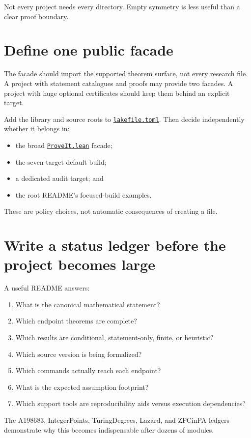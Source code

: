 \documentclass[
  10pt,
  a4paper,
  twoside,
  open=any,
  parskip=half,
  headings=big
]{scrreprt}
\newcommand{\CommitFull}{56a402bf82a9aab119fcbe3e96b991d387b221c5}
\newcommand{\RepoWeb}{https://github.com/VladimirReshetnikov/ProveIt}
\newcommand{\RepoBlobBase}{\RepoWeb/blob/\CommitFull}
\newcommand{\RepoFile}[1]{\href{\RepoBlobBase/#1}{\nolinkurl{#1}}}
\begin{document}
Not every project needs every directory. Empty symmetry is less useful than a clear proof boundary.

\section{Define one public facade}

The facade should import the supported theorem surface, not every research file. A project with statement catalogues and proofs may provide two facades. A project with huge optional certificates should keep them behind an explicit target.

Add the library and source roots to \RepoFile{lakefile.toml}. Then decide independently whether it belongs in:

\begin{itemize}
  \item the broad \RepoFile{ProveIt.lean} facade;
  \item the seven-target default build;
  \item a dedicated audit target; and
  \item the root README's focused-build examples.
\end{itemize}

These are policy choices, not automatic consequences of creating a file.

\section{Write a status ledger before the project becomes large}

A useful README answers:

\begin{enumerate}
  \item What is the canonical mathematical statement?
  \item Which endpoint theorems are complete?
  \item Which results are conditional, statement-only, finite, or heuristic?
  \item Which source version is being formalized?
  \item Which commands actually reach each endpoint?
  \item What is the expected assumption footprint?
  \item Which support tools are reproducibility aids versus execution dependencies?
\end{enumerate}

The A198683, IntegerPoints, TuringDegrees, Lazard, and ZFCinPA ledgers demonstrate why this becomes indispensable after dozens of modules.
\end{document}
